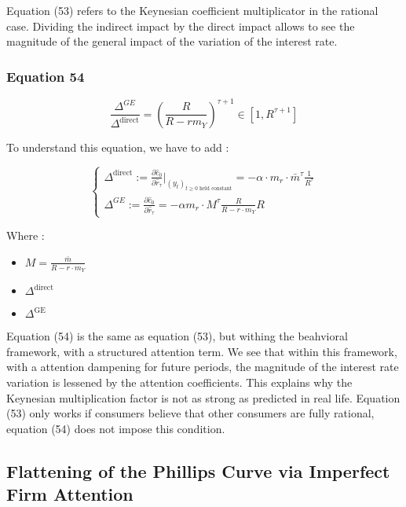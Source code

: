 \documentclass{article}
\begin{document}
Equation (53) refers to the Keynesian coefficient multiplicator in the rational case. 
Dividing the indirect impact by the direct impact allows to see the magnitude of the general impact of the variation of the interest rate. 

\subsubsection*{Equation 54}

\begin{equation}\tag{54}
    \frac{\Delta^{GE}}{\Delta^{\text{direct}}}=\left(\frac{R}{R-rm_{Y}}\right)^{\tau+1}\in\left[1, R^{\tau+1}\right]
\end{equation}

To understand this equation, we have to add :

\begin{equation*}
    \begin{cases}
        \Delta^{\text{direct}}:=\frac{\partial \hat{c}_{0}}{\partial \hat{r}_{\tau}}\bigg\rvert_{(y_{t})_{t\geq0 \text{ held constant}}} = -\alpha\cdot m_{r}\cdot\bar{m}^{\tau}\frac{1}{R^{\tau}} \\
        \Delta^{GE}:=\frac{\partial \hat{c}_{0}}{\partial \hat{r}_{\tau}}=-\alpha m_{r}\cdot M^{\tau} \frac{R}{R-r\cdot m_{Y}}R 
    \end{cases}
\end{equation*}
    
Where : 
\begin{itemize}
    \item $M= \frac{\bar{m}}{R-r\cdot m_{Y}}$ 
    \item $\Delta^{\text{direct}}$
    \item $\Delta^{\text{GE}}$
\end{itemize}

Equation (54) is the same as equation (53), but withing the beahvioral framework, with a structured attention term. 
We see that within this framework, with a attention dampening for future periods, the magnitude of the interest rate variation is lessened by the attention coefficients. 
This explains why the Keynesian multiplication factor is not as strong as predicted in real life.
Equation (53) only works if consumers believe that other consumers are fully rational, equation (54) does not impose this condition. 

\subsection{Flattening of the Phillips Curve via Imperfect Firm Attention}
\end{document}
